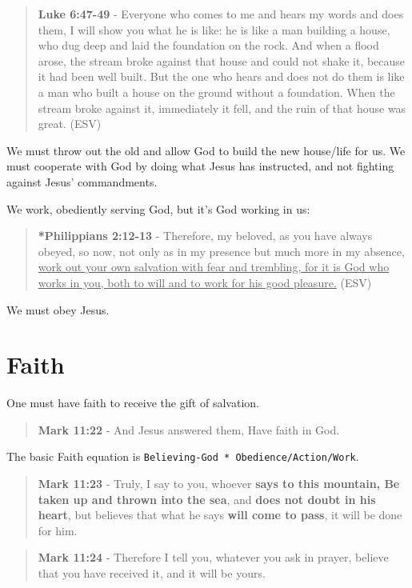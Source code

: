 \documentclass[11pt]{article}
\begin{document}
\begin{quote}
\textbf{Luke 6:47-49} - Everyone who comes to me and hears my words and does them, I will show you what he is like: he is like a man building a house, who dug deep and laid the foundation on the rock. And when a flood arose, the stream broke against that house and could not shake it, because it had been well built. But the one who hears and does not do them is like a man who built a house on the ground without a foundation. When the stream broke against it, immediately it fell, and the ruin of that house was great. (ESV)
\end{quote}

We must throw out the old and allow God to build the new house/life for us.
We must cooperate with God by doing what Jesus has instructed, and not fighting against Jesus' commandments.

We work, obediently serving God, but it's God working in us:

\begin{quote}
\textbf{*Philippians 2:12-13} - Therefore, my beloved, as you have always obeyed, so now, not only as in my presence but much more in my absence, \uline{work out your own salvation with fear and trembling, for it is God who works in you, both to will and to work for his good pleasure.} (ESV)
\end{quote}

We must obey Jesus.

\section{Faith}
\label{sec:org1b85bca}
One must have faith to receive the gift of salvation.

\begin{quote}
\textbf{Mark 11:22} - And Jesus answered them, Have faith in God.
\end{quote}

The basic Faith equation is \texttt{Believing-God * Obedience/Action/Work}.

\begin{quote}
\textbf{Mark 11:23} - Truly, I say to you, whoever \textbf{says to this mountain, Be taken up and thrown into the sea}, and \textbf{does not doubt in his heart}, but believes that what he says \textbf{will come to pass}, it will be done for him.
\end{quote}

\begin{quote}
\textbf{Mark 11:24} - Therefore I tell you, whatever you ask in prayer, believe that you have received it, and it will be yours.
\end{quote}
\end{document}
